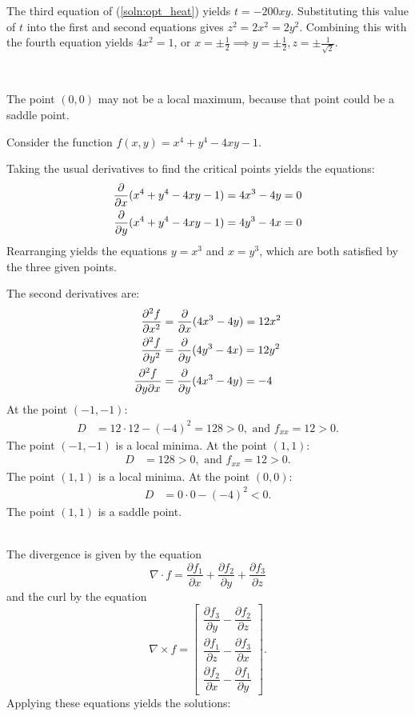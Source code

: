 The third equation of (\ref{soln:opt_heat}) yields $t = -200xy$.  Substituting
this value of $t$ into the first and second equations gives $z^2 = 2x^2 = 2y^2$.
Combining this with the fourth equation yields $4x^2 = 1$, or
$x = \pm \frac{1}{2} \implies y = \pm \frac{1}{2}, z = \pm \frac{1}{\sqrt{2}}$.
\item %
\\
\BEN
\item The point $(0,0)$ may not be a local maximum, because that point could be a saddle point.
\item Consider the function $f(x,y)=x^4+y^4-4xy-1$. 
\BEN
\item Taking the usual derivatives to find the critical points yields the equations:
\begin{align*}
  \frac{\partial}{\partial x} (x^4+y^4-4xy-1) &= 4x^3-4y =0 \\
  \frac{\partial}{\partial y} (x^4+y^4-4xy-1) &= 4y^3-4x =0
\end{align*}
Rearranging yields the equations $y=x^3$ and $x=y^3$, which are both satisfied by the three given points. 
\item The second derivatives are:
\begin{align*}
  \frac{\partial^2 f}{ \partial x^2} &= \frac{\partial}{\partial x} (4x^3-4y) = 12x^2 \\
  \frac{\partial^2 f}{ \partial y^2} &= \frac{\partial}{\partial y} (4y^3-4x) = 12y^2 \\
  \frac{\partial^2 f}{\partial y \partial x} &= \frac{\partial}{\partial y} (4x^3-4y) = -4
\end{align*}
At the point $(-1,-1)$:
\begin{align*}
  D &= 12\cdot12-(-4)^2=128 > 0, \text{ and } f_{xx} = 12 >0.
\end{align*}
The point $(-1,-1)$ is a local minima. At the point $(1,1)$:
\begin{align*}
  D &= 128 > 0, \text{ and } f_{xx} = 12 >0.
\end{align*}
The point $(1,1)$ is a local minima. At the point $(0,0)$:
\begin{align*}
  D &= 0\cdot0-(-4)^2 < 0.
\end{align*}
The point $(1,1)$ is a saddle point.
\EEN
\EEN
\item
{}\\
The divergence is given by the equation \[
 \nabla \cdot f = \frac{\partial f_1}{\partial x} + \frac{\partial f_2}{\partial y} + \frac{\partial f_3}{\partial z}
\] and the curl by the equation \[
 \nabla \times f = \begin{bmatrix}
  \dfrac{\partial f_3}{\partial y} - \dfrac{\partial f_2}{\partial z} \\
  \dfrac{\partial f_1}{\partial z} - \dfrac{\partial f_3}{\partial x} \\
  \dfrac{\partial f_2}{\partial x} - \dfrac{\partial f_1}{\partial y}
 \end{bmatrix}.
\]  Applying these equations yields the solutions:

